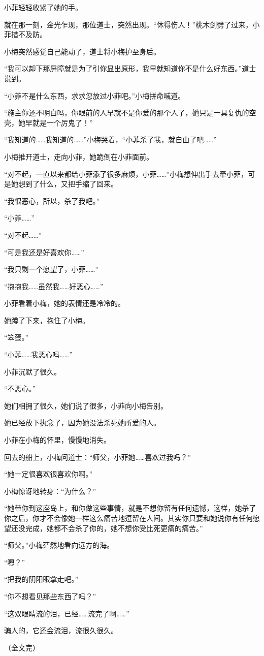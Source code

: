 \documentclass[12pt,a4paper]{ctexart}
\begin{document}
小菲轻轻收紧了她的手。

就在那一刻，金光乍现，那位道士，突然出现。“休得伤人！”桃木剑劈了过来，小菲措不及防。

小梅突然感觉自己能动了，道士将小梅护至身后。

“我可以卸下那屏障就是为了引你显出原形，我早就知道你不是什么好东西。”道士说到。

“小菲不是什么东西，求求您放过小菲吧。”小梅拼命喊道。

“施主你还不明白吗，你眼前的人早就不是你爱的那个人了，她只是一具复仇的空壳，她早就是一个厉鬼了！”

“我知道的……我知道的……”小梅哭着，“小菲杀了我，就自由了吧……”

小梅推开道士，走向小菲，她跪倒在小菲面前。

“对不起，一直以来都给小菲添了很多麻烦，小菲……”小梅想伸出手去牵小菲，可是她想到了什么，又把手缩了回来。

“我很恶心，所以，杀了我吧。”

“小菲……”

“对不起……”

“可是我还是好喜欢你……”

“我只剩一个愿望了，小菲……”

“抱抱我……虽然我……好恶心……”

小菲看着小梅，她的表情还是冷冷的。

她蹲了下来，抱住了小梅。

“笨蛋。”

“小菲……我恶心吗……”

小菲沉默了很久。

“不恶心。”

她们相拥了很久，她们说了很多，小菲向小梅告别。

她已经放下执念了，因为她没法杀死她所爱的人。

小菲在小梅的怀里，慢慢地消失。

回去的船上，小梅问道士：“师父，小菲她……喜欢过我吗？”

“她一定很喜欢很喜欢你啊。”

小梅惊讶地转身：“为什么？”

“她带你到这座岛上，和你做这些事情，就是不想你留有任何遗憾，这样，她杀了你之后，你才不会像她一样这么痛苦地逗留在人间。其实你只要和她说你有任何愿望还没完成，她都不会杀了你的，她不想你受比死更痛的痛苦。”

“师父。”小梅茫然地看向远方的海。

“嗯？”

“把我的阴阳眼拿走吧。”

“你不想看见那些东西了吗？”

“这双眼睛流的泪，已经……流完了啊……”

骗人的，它还会流泪，流很久很久。

（全文完）
\end{document}
